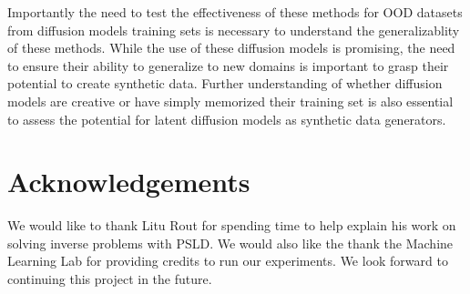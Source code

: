 \documentclass{article}
\begin{document}
Importantly the need to test the effectiveness of these methods for OOD datasets from diffusion models training sets is necessary to understand the generalizablity 
of these methods. While the use of these diffusion models is promising, the need to ensure their ability to generalize to new domains is important to grasp their potential
to create synthetic data. Further understanding of whether diffusion models are creative or have simply memorized their training set is also essential to assess the potential 
for latent diffusion models as synthetic data generators.

\section*{Acknowledgements}

We would like to thank Litu Rout for spending time to help explain his work on solving inverse problems with PSLD. We would also like the thank the Machine Learning Lab for
providing credits to run our experiments. We look forward to continuing this project in the future.



\end{document}
